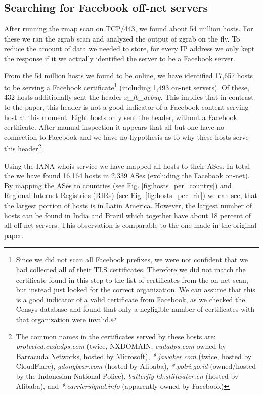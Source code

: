 \documentclass[sigconf,10pt,nonacm]{acmart}
\begin{document}
\subsection{Searching for Facebook off-net servers}

After running the zmap scan on TCP/443, we found about 54 million hosts. For these we ran the zgrab scan and analyzed the output of zgrab on the fly. To reduce the amount of data we needed to store, for every IP address we only kept the response if it we actually identified the server to be a Facebook server.

From the 54 million hosts we found to be online, we have identified 17,657 hosts to be serving a Facebook certificate\footnote{Since we did not scan all Facebook prefixes, we were not confident that we had collected all of their TLS certificates. Therefore we did not match the certificate found in this step to the list of certificates from the on-net scan, but instead just looked for the correct organization. We can assume that this is a good indicator of a valid certificate from Facebook, as we checked the Censys database and found that only a negligible number of certificates with that organization were invalid.} (including 1,493 on-net servers). Of these, 432 hosts additionally sent the header \textit{x\_fb\_debug}. This implies that in contrast to the paper, this header is not a good indicator of a Facebook content serving host at this moment. Eight hosts only sent the header, without a Facebook certificate. After manual inspection it appears that all but one have no connection to Facebook and we have no hypothesis as to why these hosts serve this header\footnote{The common names in the certificates served by these hosts are: \textit{protected.cudadps.com} (twice, NXDOMAIN, \textit{cudadps.com} owned by Barracuda Networks, hosted by Microsoft), \textit{*.jawaker.com} (twice, hosted by CloudFlare), \textit{gdongbear.com} (hosted by Alibaba), \textit{*.polri.go.id} (owned/hosted by the Indonesian National Police), \textit{butterfly-hk.stillwater.cn} (hosted by Alibaba), and \textit{*.carriersignal.info} (apparently owned by Facebook)}.

Using the IANA whois service we have mapped all hosts to their ASes. In total the we have found 16,164 hosts in 2,339 ASes (excluding the Facebook on-net). By mapping the ASes to countries (see Fig. \ref{fig:hosts_per_country}) and Regional Internet Registries (RIRs) (see Fig. \ref{fig:hosts_per_rir}) we can see, that the largest portion of hosts is in Latin America. However, the largest number of hosts can be found in India and Brazil which together have about 18 percent of all off-net servers. This observation is comparable to the one made in the original paper.
\end{document}

